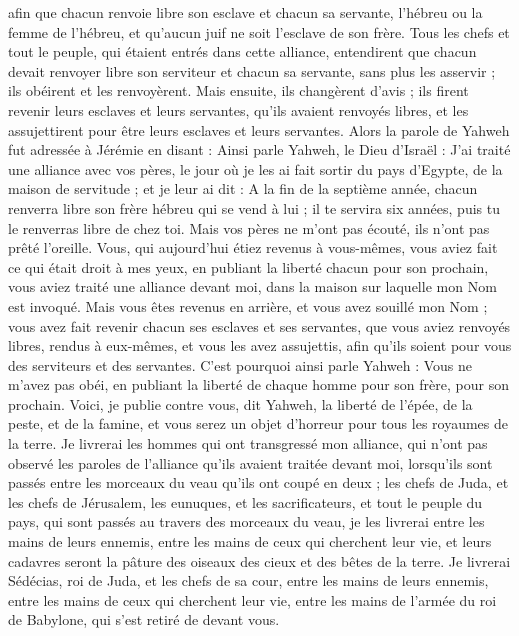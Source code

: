 \begin{multicols}{2}
afin que chacun renvoie libre son esclave et chacun sa servante, l’hébreu ou la femme de l’hébreu, et qu’aucun juif ne soit l'esclave de son frère.
Tous les chefs et tout le peuple, qui étaient entrés dans cette alliance, entendirent que chacun devait renvoyer libre son serviteur et chacun sa servante, sans plus les asservir ; ils obéirent et les renvoyèrent.
Mais ensuite, ils changèrent d'avis ; ils firent revenir leurs esclaves et leurs servantes, qu'ils avaient renvoyés libres, et les assujettirent pour être leurs esclaves et leurs servantes.
Alors la parole de Yahweh fut adressée à Jérémie en disant :
Ainsi parle Yahweh, le Dieu d'Israël : J’ai traité une alliance avec vos pères, le jour où je les ai fait sortir du pays d'Egypte, de la maison de servitude ; et je leur ai dit :
A la fin de la septième année, chacun renverra libre son frère hébreu qui se vend à lui ; il te servira six années, puis tu le renverras libre de chez toi. Mais vos pères ne m'ont pas écouté, ils n'ont pas prêté l’oreille.
Vous, qui aujourd'hui étiez revenus à vous-mêmes, vous aviez fait ce qui était droit à mes yeux, en publiant la liberté chacun pour son prochain, vous aviez traité une alliance devant moi, dans la maison sur laquelle mon Nom est invoqué.
Mais vous êtes revenus en arrière, et vous avez souillé mon Nom ; vous avez fait revenir chacun ses esclaves et ses servantes, que vous aviez renvoyés libres, rendus à eux-mêmes, et vous les avez assujettis, afin qu'ils soient pour vous des serviteurs et des servantes.
C'est pourquoi ainsi parle Yahweh : Vous ne m'avez pas obéi, en publiant la liberté de chaque homme pour son frère, pour son prochain. Voici, je publie contre vous, dit Yahweh, la liberté de l'épée, de la peste, et de la famine, et vous serez un objet d’horreur pour tous les royaumes de la terre.
Je livrerai les hommes qui ont transgressé mon alliance, qui n'ont pas observé les paroles de l'alliance qu'ils avaient traitée devant moi, lorsqu'ils sont passés entre les morceaux du veau qu'ils ont coupé en deux ;
les chefs de Juda, et les chefs de Jérusalem, les eunuques, et les sacrificateurs, et tout le peuple du pays, qui sont passés au travers des morceaux du veau,
je les livrerai entre les mains de leurs ennemis, entre les mains de ceux qui cherchent leur vie, et leurs cadavres seront la pâture des oiseaux des cieux et des bêtes de la terre.
Je livrerai Sédécias, roi de Juda, et les chefs de sa cour, entre les mains de leurs ennemis, entre les mains de ceux qui cherchent leur vie, entre les mains de l'armée du roi de Babylone, qui s'est retiré de devant vous.

\end{multicols}
